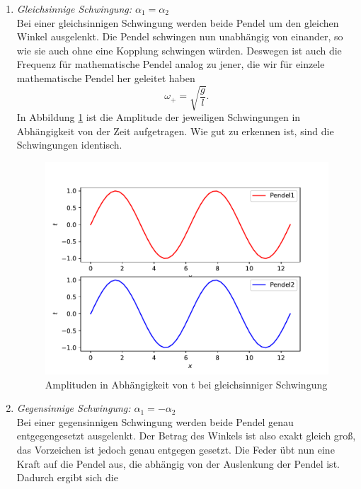 \begin{enumerate}
    \item \textit{Gleichsinnige Schwingung: $\alpha_1=\alpha_2$} \\
        Bei einer gleichsinnigen Schwingung werden beide Pendel um den gleichen Winkel ausgelenkt. Die Pendel schwingen nun unabhängig von einander,
        so wie sie auch ohne eine Kopplung schwingen würden. Deswegen ist auch die Frequenz für mathematische Pendel analog zu jener, die wir für einzele
        mathematische Pendel her geleitet haben
        \begin{equation}
            \omega_{+}=\sqrt{\frac{g}{l}}.
        \end{equation}
        In Abbildung \ref{fig:gleichsinnig} ist die Amplitude der jeweiligen Schwingungen in Abhängigkeit von der Zeit aufgetragen. Wie gut zu erkennen ist, sind
        die Schwingungen identisch.
    \begin{figure}
        \centering
        \includegraphics[scale = 0.7]{gleichsinnig.pdf}
        \caption{Amplituden in Abhängigkeit von t bei gleichsinniger Schwingung}
        \label{fig:gleichsinnig}
      \end{figure}
    \item \textit{Gegensinnige Schwingung: $\alpha_1=-\alpha_2$}\\
        Bei einer gegensinnigen Schwingung werden beide Pendel genau entgegengesetzt ausgelenkt. Der Betrag des Winkels ist also exakt gleich groß, das Vorzeichen
        ist jedoch genau entgegen gesetzt. Die Feder übt nun eine Kraft auf die Pendel aus, die abhängig von der Auslenkung der Pendel ist. Dadurch ergibt sich die

\end{enumerate}
